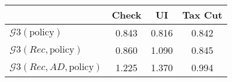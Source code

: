 \begin{tabular}{@{}lccc@{}} 
\toprule 
                          & Check      & UI    & Tax Cut    \\  \midrule 
$\mathcal{G}3(\text{policy})$ & 0.843  & 0.816  & 0.842     \\ 
$\mathcal{G}3(Rec,\text{policy})$ & 0.860  & 1.090  & 0.845     \\ 
$\mathcal{G}3(Rec, AD,\text{policy})$ & 1.225  & 1.370  & 0.994     \\ 
\end{tabular}  
